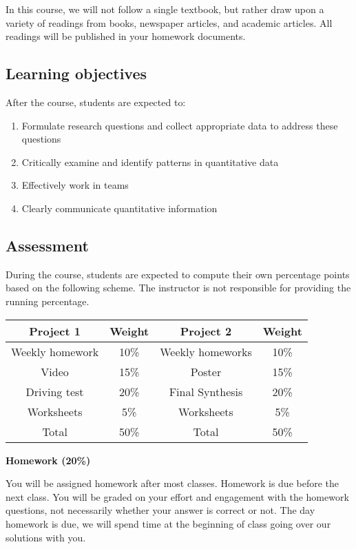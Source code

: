 \documentclass[
]{article}
\begin{document}
In this course, we will not follow a single textbook, but rather draw upon a variety of readings from books, newspaper articles, and academic articles. All readings will be published in your homework documents.

\hypertarget{learning-objectives}{%
\subsection*{Learning objectives}\label{learning-objectives}}

After the course, students are expected to:

\begin{enumerate}
\def\labelenumi{\arabic{enumi}.}
\item
  Formulate research questions and collect appropriate data to address these questions
\item
  Critically examine and identify patterns in quantitative data
\item
  Effectively work in teams
\item
  Clearly communicate quantitative information
\end{enumerate}

\hypertarget{assessment}{%
\subsection*{Assessment}\label{assessment}}

During the course, students are expected to compute their own percentage
points based on the following scheme.
The instructor is not responsible for providing the running percentage.

\begin{longtable}[]{@{}cccc@{}}
\toprule
\textbf{Project 1} & \textbf{Weight} & \textbf{Project 2} & \textbf{Weight}\tabularnewline
\midrule
\endhead
Weekly homework & 10\% & Weekly homeworks & 10\%\tabularnewline
Video & 15\% & Poster & 15\%\tabularnewline
Driving test & 20\% & Final Synthesis & 20\%\tabularnewline
Worksheets & 5\% & Worksheets & 5\%\tabularnewline
Total & 50\% & Total & 50\%\tabularnewline
\bottomrule
\end{longtable}

\textbf{Homework (20\%)}

You will be assigned homework after most classes. Homework is due before the next class. You will be graded on your effort and engagement with the homework questions, not necessarily whether your answer is correct or not. The day homework is due, we will spend time at the beginning of class going over our solutions with you.
\end{document}
